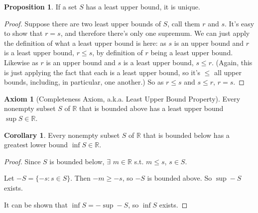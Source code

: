 \documentclass{article}
\theoremstyle{definition}
\newtheorem{proposition}{Proposition}[section]
\newtheorem{axiom}{Axiom}[section]
\newtheorem{corollary}{Corollary}[section]
\begin{document}
\begin{proposition}
If a set $S$ has a least upper bound, it is unique.
\end{proposition}

\begin{proof}
Suppose there are two least upper bounds of $S$, call them $r$ and $s$. It's easy to show that $r = s$, and therefore there's only one supremum. We can just apply the definition of what a least upper bound is here: as $s$ is an upper bound and $r$ is a least upper bound, $r \leq s$, by definition of $r$ being a least upper bound. Likewise as $r$ is an upper bound and $s$ is a least upper bound, $s \leq r$. (Again, this is just applying the fact that each is a least upper bound, so it's $\leq$ all upper bounds, including, in particular, one another.) So as $r \leq s$ and $s \leq r$, $r = s$.
\end{proof}

\begin{axiom}[Completeness Axiom, a.k.a. Least Upper Bound Property]
Every nonempty subset $S$ of $\mathbb{R}$ that is bounded above has a least upper bound $\sup S \in\mathbb{R}$.
\end{axiom}

\begin{corollary}
Every nonempty subset $S$ of $\mathbb{R}$ that is bounded below has a greatest lower bound $\inf S \in\mathbb{R}$.
\end{corollary}

\begin{proof}
Since $S$ is bounded below, $\exists$ $m \in \mathbb{R}$ s.t. $m \leq s$, $s \in S$.

Let $-S = \{ -s : s \in S \}$. Then $-m \ge -s$, so $-S$ is bounded above. So $\sup -S$ exists.

It can be shown that $\inf S = - \sup -S$, so $\inf S$ exists.

\end{proof}
\end{document}
